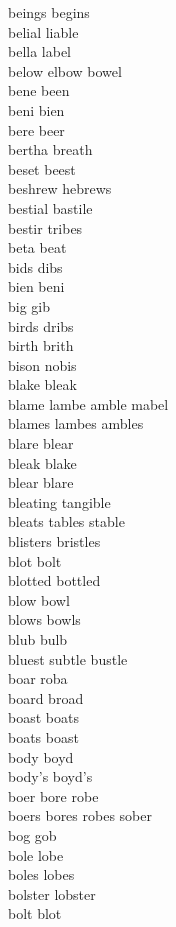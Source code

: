 beings begins\\
belial liable\\
bella label\\
below elbow bowel\\
bene been\\
beni bien\\
bere beer\\
bertha breath\\
beset beest\\
beshrew hebrews\\
bestial bastile\\
bestir tribes\\
beta beat\\
bids dibs\\
bien beni\\
big gib\\
birds dribs\\
birth brith\\
bison nobis\\
blake bleak\\
blame lambe amble mabel\\
blames lambes ambles\\
blare blear\\
bleak blake\\
blear blare\\
bleating tangible\\
bleats tables stable\\
blisters bristles\\
blot bolt\\
blotted bottled\\
blow bowl\\
blows bowls\\
blub bulb\\
bluest subtle bustle\\
boar roba\\
board broad\\
boast boats\\
boats boast\\
body boyd\\
body's boyd's\\
boer bore robe\\
boers bores robes sober\\
bog gob\\
bole lobe\\
boles lobes\\
bolster lobster\\
bolt blot\\
